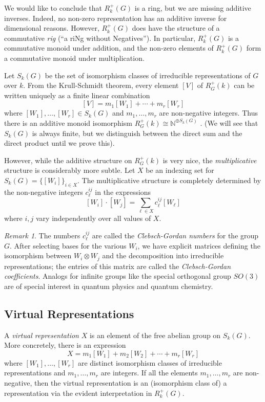 \documentclass[12pt]{article}
\theoremstyle{plain}
\theoremstyle{definition}
\theoremstyle{remark}
\newtheorem{remark}[theorem]{Remark}
\numberwithin{equation}{section}
\begin{document}
We would like to conclude that $R^+_k(G)$ is a ring,
but we are missing additive inverses.  Indeed, no non-zero
representation has an additive inverse for dimensional reasons.
However, $R^+_k(G)$ does have the structure of a commutative \emph{rig}
(``a riNg without Negatives'').
In particular, $R^+_k(G)$ is a commutative monoid under addition,
and the non-zero elements of $R^+_k(G)$ form a commutative monoid under
multiplication.

Let $S_k(G)$ be the set of isomorphism classes of
irreducible representations of $G$ over $k$.
From the Krull-Schmidt theorem, every element $[V]$ of $R^+_G(k)$
can be written uniquely as a finite linear combination
\[
[V] = m_1 [W_1] + \cdots + m_r [W_r]
\]
where $[W_1],\ldots,[W_r] \in S_k(G)$ and $m_1,\ldots, m_r$ are
non-negative integers.
Thus there is an additive monoid isomorphism
$R^+_G(k) \cong \mathbb{N}^{\oplus S_k(G)}$ .
(We will see that $S_k(G)$ is always finite, but we distinguish between
the direct sum and the direct product until we prove this).

However, while the additive structure on $R^+_G(k)$ is very nice,
the \emph{multiplicative} structure is considerably more subtle.
Let $X$ be an indexing set for $S_k(G) = \{[W_i]\}_{i \in X}$.
The multiplicative structure is completely determined by the
non-negative integers $c^{ij}_\ell$ in the expressions
\[
[W_i] \cdot [W_j] = \sum_{\ell \in X} c^{ij}_\ell [W_\ell]
\]
where $i,j$ vary independently over all values of $X$.

\begin{remark}
The numbers $c^{ij}_\ell$ are called the \emph{Clebsch-Gordan numbers}
for the group $G$.  After selecting bases for the various $W_i$,
we have explicit matrices defining the isomorphism between
$W_i \otimes W_j$ and the decomposition into irreducible representations;
the entries of this matrix are called the \emph{Clebsch-Gordan
coefficients}.  Analogs for infinite groups like the special orthogonal
group $SO(3)$ are of special interest in quantum physics and quantum
chemistry.
\end{remark}

\subsection{Virtual Representations}

A \emph{virtual representation} $X$ is an element of the free abelian
group on $S_k(G)$.
More concretely, there is an expression
\[
X = m_1 [W_1] + m_2 [W_2] + \cdots + m_r [W_r]
\]
where $[W_1],\ldots,[W_r]$ are distinct isomorphism classes of
irreducible representations
and $m_1,\ldots, m_r$ are integers.
If all the elements $m_1,\ldots,m_r$ are non-negative,
then the virtual representation is an (isomorphism class of) a
representation via the evident interpretation in $R^+_k(G)$.
\end{document}
